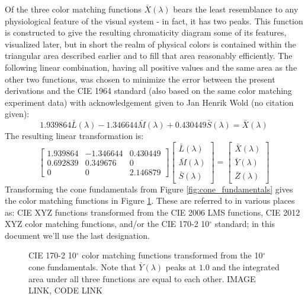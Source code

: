 \documentclass[twocolumn]{article}
\newif\ifinvert
\begin{document}
Of the three color matching functions $\bar{X}(\lambda)$ bears the least resemblance to any physiological feature of the visual system - in fact, it has two peaks.  This function is constructed to give the resulting chromaticity diagram some of its features, visualized later, but in short the realm of physical colors is contained within the triangular area described earlier and to fill that area reasonably efficiently.  The following linear combination, having all positive values and the same area as the other two functions, was chosen to minimize the error between the present derivations and the CIE 1964 standard (also based on the same color matching experiment data) with acknowledgement given to Jan Henrik Wold (no citation given):
\begin{equation}
    1.939864\bar{L}(\lambda)-1.346644\bar{M}(\lambda)+0.430449\bar{S}(\lambda)=\bar{X}(\lambda)
\end{equation}
The resulting linear transformation is:
\begin{equation}
    \begin{bmatrix}
        1.939864&-1.346644&0.430449\\
        0.692839&0.349676&0\\
        0&0&2.146879
    \end{bmatrix}\begin{bmatrix}
        \bar{L}(\lambda)\\
        \bar{M}(\lambda)\\
        \bar{S}(\lambda)
    \end{bmatrix}=\begin{bmatrix}
        \bar{X}(\lambda)\\
        \bar{Y}(\lambda)\\
        \bar{Z}(\lambda)
    \end{bmatrix}
\end{equation}
Transforming the cone fundamentals from Figure \ref{fig:cone_fundamentals} gives the color matching functions in Figure \ref{fig:color_matching_functions}.  These are referred to in various places as: CIE XYZ functions transformed from the CIE 2006 LMS functions, CIE 2012 XYZ color matching functions, and/or the CIE 170-2 10$^\circ$ standard; in this document we'll use the last designation.
\begin{figure}[h]
    \ifinvert
        
    \else
        
    \fi
    \caption{CIE 170-2 10$^\circ$ color matching functions transformed from the 10$^\circ$ cone fundamentals.  Note that $\bar{Y}(\lambda)$ peaks at $1.0$ and the integrated area under all three functions are equal to each other. IMAGE LINK, CODE LINK}\label{fig:color_matching_functions}
\end{figure}
\end{document}
